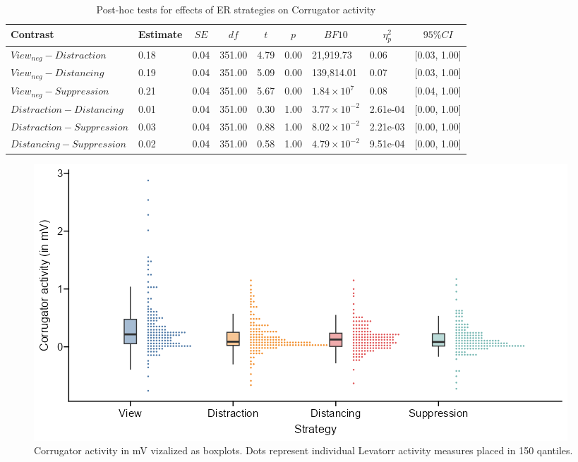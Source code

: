 \documentclass[
  man,floatsintext]{apa6}
\begin{document}
\begin{table}[H]

\begin{center}
\begin{threeparttable}

\caption{\label{tab:SupplEffectCorrReg}Post-hoc tests for effects of ER strategies on Corrugator activity}

\footnotesize{

\begin{tabular}{lllllllll}
\toprule
Contrast & \multicolumn{1}{c}{Estimate} & \multicolumn{1}{c}{$SE$} & \multicolumn{1}{c}{$df$} & \multicolumn{1}{c}{$t$} & \multicolumn{1}{c}{$p$} & \multicolumn{1}{c}{$BF10$} & \multicolumn{1}{c}{$\eta_{p}^{2}$} & \multicolumn{1}{c}{$95\% CI$}\\
\midrule
$View_{neg} - Distraction$ & 0.18 & 0.04 & 351.00 & 4.79 & 0.00 & 21,919.73 & 0.06 & {}[0.03, 1.00]\\
$View_{neg} - Distancing$ & 0.19 & 0.04 & 351.00 & 5.09 & 0.00 & 139,814.01 & 0.07 & {}[0.03, 1.00]\\
$View_{neg} - Suppression$ & 0.21 & 0.04 & 351.00 & 5.67 & 0.00 & $1.84 \times 10^{7}$ & 0.08 & {}[0.04, 1.00]\\
$Distraction - Distancing$ & 0.01 & 0.04 & 351.00 & 0.30 & 1.00 & $3.77 \times 10^{-2}$ & 2.61e-04 & {}[0.00, 1.00]\\
$Distraction - Suppression$ & 0.03 & 0.04 & 351.00 & 0.88 & 1.00 & $8.02 \times 10^{-2}$ & 2.21e-03 & {}[0.00, 1.00]\\
$Distancing - Suppression$ & 0.02 & 0.04 & 351.00 & 0.58 & 1.00 & $4.79 \times 10^{-2}$ & 9.51e-04 & {}[0.00, 1.00]\\
\bottomrule
\end{tabular}

}

\end{threeparttable}
\end{center}

\end{table}

\begin{figure}[H]
\includegraphics[width=\textwidth]{figures/FigCorrReg} \caption{Corrugator activity in mV vizalized as boxplots. Dots represent individual Levatorr activity measures placed in 150 qantiles.}\label{fig:SupplFigCorrReg}
\end{figure}
\end{document}
